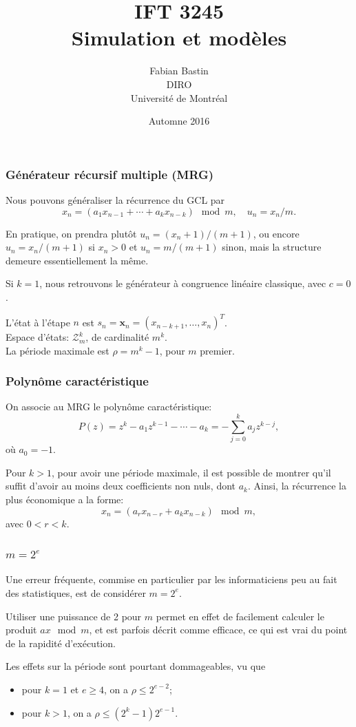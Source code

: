 \documentclass[t,usepdftitle=false]{beamer}
\title[IFT3245]{IFT 3245\\Simulation et modèles}
\author[Fabian Bastin]{Fabian Bastin\\DIRO\\Université de Montréal}
\date{Automne 2016}
\def\bx{\boldsymbol{x}}
\begin{document}
\frame{\titlepage}

\begin{frame}
\frametitle{Générateur récursif multiple (MRG)}

Nous pouvons généraliser la récurrence du GCL par
\[
  {x_n} = (a_1 x_{n-1} + \cdots + a_k x_{n-k}) \mod {m}, \quad  
  {u_n} = x_n / m.
\]

\mbox{}

En pratique, on prendra plutôt $u_n = (x_n + 1) / (m+1)$,
ou encore $u_n = x_n/(m+1)$ si $x_n>0$ et $u_n = m/(m+1)$ sinon, mais
la structure demeure essentiellement la même.

\mbox{}

Si $k=1$, nous retrouvons le générateur à congruence linéaire
classique, avec $c = 0$.

\mbox{}

L'état à l'étape $n$ est
$s_n = {\bx_n} = (x_{n-k+1},\dots,x_n)^T$.\\
Espace d'états: $\mathcal{Z}_m^k$, de cardinalité $m^k$.\\
La période maximale est ${\rho} = m^k-1$, pour $m$ premier.

\end{frame}

\begin{frame}
\frametitle{Polynôme caractéristique}

On associe au MRG le polynôme caractéristique:
\[
  P(z) = z^k - a_1 z^{k-1} - \cdots - a_k
       = -\sum_{j=0}^k a_j z^{k-j},
\]
où $a_0=-1$.

\mbox{}

Pour $k > 1$, pour avoir une période maximale, il est possible de
montrer qu'il suffit d'avoir au moins deux coefficients non nuls, dont
$a_k$.
Ainsi, la récurrence la plus économique a la forme:
\[
 x_n = (a_r x_{n-r} + a_k x_{n-k}) \mod m,      \]
avec $0 < r < k$.

\end{frame}

\begin{frame}
\frametitle{$m=2^e$}

Une erreur fréquente, commise en particulier par les informaticiens
peu au fait des statistiques, est de considérer $m = 2^e$.

\mbox{}

Utiliser une puissance de 2 pour $m$ permet en effet de facilement calculer le
produit $ax \mod m$, et est parfois décrit comme efficace, ce qui est
vrai du point de la rapidité d'exécution.

\mbox{}

Les effets sur la période sont pourtant dommageables, vu que
\begin{itemize}
\item
pour $k=1$ et $e\ge 4$, on a $\rho \le 2^{e-2}$;
\item
pour $k > 1$, on a $\rho \le (2^k-1)2^{e-1}$.
\end{itemize}

\end{frame}
\end{document}
